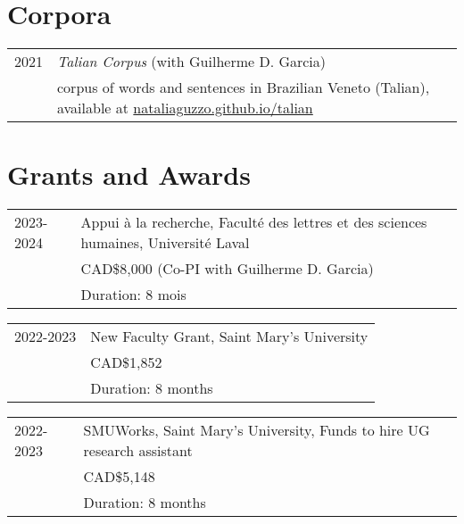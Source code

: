 \documentclass[letterpaper,10pt]{article}
\begin{document}
 
 
 
 
  \vspace{0.3cm}
 
 \section{Corpora}
 
 \begin{tabular}{p{1cm}p{16cm}}

2021	& \emph{Talian Corpus} (with Guilherme D. Garcia) \\
		& corpus of words and sentences in Brazilian Veneto (Talian), available at \href{https://nataliaguzzo.github.io/talian}{nataliaguzzo.github.io/talian}
\end{tabular}
 
 
 \vspace{0.3cm}
 
 
 
 \section{Grants and Awards}
\begin{tabular}{p{1.6cm}p{15.2cm}}
 2023-2024   & Appui \`{a} la recherche, Facult\'e des lettres et des sciences humaines, Universit\'e Laval\\
 & CAD\$8,000 (Co-PI with Guilherme D. Garcia)\\
    & Duration: 8 mois
  \end{tabular}


\begin{tabular}{p{1.6cm}p{15.2cm}}
 2022-2023   & New Faculty Grant, Saint Mary's University\\
 & CAD\$1,852 \\
    & Duration: 8 months
  \end{tabular}


\begin{tabular}{p{1.6cm}p{15.2cm}}
 2022-2023   & SMUWorks, Saint Mary's University, Funds to hire UG research assistant\\
 & CAD\$5,148 \\
    & Duration: 8 months
  \end{tabular}
\end{document}
